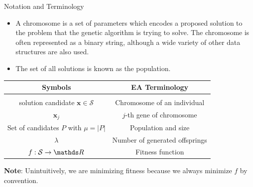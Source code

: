 \documentclass[11pt,compress,t,notes=noshow, xcolor=table]{beamer}
\begin{document}
\begin{vbframe}{Notation and Terminology}

\footnotesize
\begin{itemize}
\item A chromosome is a set of parameters which encodes a proposed solution to the problem that the genetic algorithm is trying to solve. The chromosome is often represented as a binary string, although a wide variety of other data structures are also used.\\
\item The set of all solutions is known as the population.
\end{itemize}
\vspace{0.5cm}
\normalsize
\begin{center}
\begin{tabular}{ c | c}
    \textbf{Symbols} & \textbf{EA Terminology} \\[0.05cm]
    \hline \\[0.01cm]
    solution candidate $\bm{x}\in \mathcal{S}$ & Chromosome of an individual \\[0.1cm]
    $\bm{x}_j$  & $j$-th gene of chromosome\\[0.1cm]
    Set of candidates $P$ with $\mu = |P|$ & Population and size \\[0.1cm]
    $\lambda$ & Number of generated offsprings\\[0.1cm]
    $f: \mathcal{S} \to \R$ & Fitness function
\end{tabular}
\end{center}

\textbf{Note}: Unintuitively, we are minimizing fitness because we always minimize $f$ by convention.




\end{vbframe}
\end{document}
